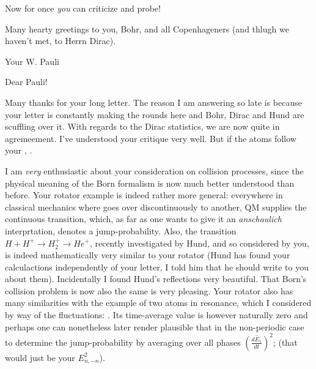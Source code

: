 \documentclass{article}
\begin{document}
 Now for once \textit{you} can criticize and probe!

Many hearty greetings to you, Bohr, and all Copenhageners (and thlugh we haven't met, to Herrn Dirac).

Your W. Pauli

\date{October 28, 1926}

Dear Pauli!

Many thanks for your long letter. The reason I am answering so late is because your letter is constantly making the rounds here and Bohr, Dirac and Hund are scuffling over it. With regards to the Dirac statistics, we are now quite in agremeement. I've understood your critique very well. But if the atoms follow your , .

I am \textit{very} enthusiastic about your consideration on collision processes, since the physical meaning of the Born formalism is now much better understood than before. Your rotator example is indeed rather more general: everywhere in classical mechanics where  goes over discontinuously to another, QM supplies the continuous transition, which, as far as one wants to give it an \textit{anschaulich} interprtation, denotes a jump-probability. Also, the transition $H + H^+ \to H^+_2 \to He^+$, recently investigated by Hund, and so  considered by you, is indeed mathematically very similar to your rotator (Hund has found your calculactions independently of your letter, I told him that he should write to you about them). Incidentally I found Hund's reflections very beautiful. That Born's collision problem is now also the same is very pleasing. Your rotator also has many similarities with the example of two atoms in resonance, which I considered by way of the fluctuations: . Its time-average value is however naturally zero and perhaps one can nonetheless later render plausible that in the non-periodic case to determine the jump-probability by averaging over all phases $\left(\overline{\frac{dE_1}{dt}}\right)^2$; (that would just be your $E^2_{n,-n}$).
\end{document}
